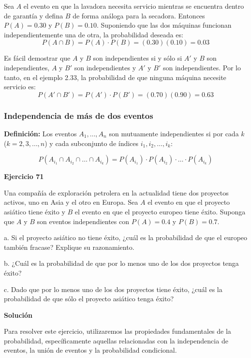 \documentclass[a4paper]{article}
\begin{document}
Sea $A$ el evento en que la lavadora necesita servicio mientras se encuentra dentro de garantía y defina $B$ de forma análoga para la secadora. Entonces $P(A) = 0.30$ y $P(B) = 0.10$. Suponiendo que las dos máquinas funcionan independientemente una de otra, la probabilidad deseada es:
$$ P(A \cap B) = P(A) \cdot P(B) = (0.30)(0.10) = 0.03 $$

Es fácil demostrar que $A$ y $B$ son independientes si y sólo si $A'$ y $B$ son independientes, $A$ y $B'$ son independientes y $A'$ y $B'$ son independientes. Por lo tanto, en el ejemplo 2.33, la probabilidad de que ninguna máquina necesite servicio es:
$$ P(A' \cap B') = P(A') \cdot P(B') = (0.70)(0.90) = 0.63 $$

\subsubsection{Independencia de más de dos eventos}

\textbf{Definición:}
Los eventos $A_1, \dots, A_n$ son mutuamente independientes si por cada $k$ ($k = 2, 3, \dots, n$) y cada subconjunto de índices $i_1, i_2, \dots, i_k$:

$$ P(A_{i_1} \cap A_{i_2} \cap \dots \cap A_{i_k}) = P(A_{i_1}) \cdot P(A_{i_2}) \cdot \dots \cdot P(A_{i_k}) $$

\textbf{Ejercicio 71}

Una compañía de exploración petrolera en la actualidad tiene dos proyectos activos, uno en Asia y el otro en Europa. Sea $A$ el evento en que el proyecto asiático tiene éxito y $B$ el evento en que el proyecto europeo tiene éxito. Suponga que $A$ y $B$ son eventos independientes con $P(A) = 0.4$ y $P(B) = 0.7$.

a. Si el proyecto asiático no tiene éxito, ¿cuál es la probabilidad de que el europeo también fracase? Explique su razonamiento.

b. ¿Cuál es la probabilidad de que por lo menos uno de los dos proyectos tenga éxito?

c. Dado que por lo menos uno de los dos proyectos tiene éxito, ¿cuál es la probabilidad de que sólo el proyecto asiático tenga éxito?

\vspace{0.5cm}

\textbf{Solución}

Para resolver este ejercicio, utilizaremos las propiedades fundamentales de la probabilidad, específicamente aquellas relacionadas con la independencia de eventos, la unión de eventos y la probabilidad condicional.
\end{document}
